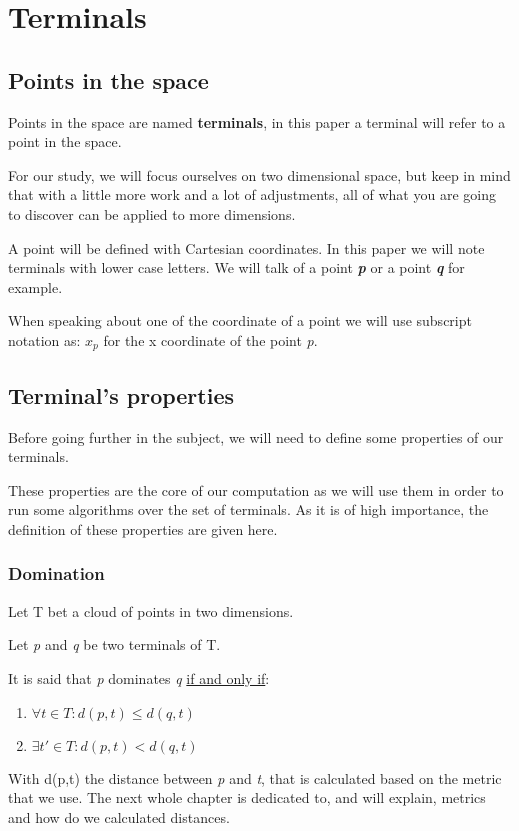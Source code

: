 \chapter{Terminals}
\section{Points in the space}
Points in the space are named \textbf{terminals}, in this paper a terminal will refer to a point in the space.\newline

For our study, we will focus ourselves on two dimensional space, but keep in mind that with a little more work and a lot of adjustments, all of what you are going to discover can be applied to more dimensions.

A point will be defined with Cartesian coordinates. In this paper we will note terminals with lower case letters. We will talk of a point \textbf{\emph{p}} or a point \textbf{\emph{q}} for example.

When speaking about one of the coordinate of a point we will use subscript notation as: $x_p$ for the x coordinate of the point \emph{p}.

\section{Terminal's properties} %
Before going further in the subject, we will need to define some properties of our terminals.

These properties are the core of our computation as we will use them in order to run some algorithms over the set of terminals. As it is of high importance, the definition of these properties are given here. 
\subsection{Domination} %
Let T bet a cloud of points in two dimensions.

Let \emph{p} and \emph{q} be two terminals of T.

\noindent It is said that \emph{p} dominates \emph{q} \underline{if and only if}:
\begin{enumerate}
	\item{$\forall t \in T : d(p,t) \leq d(q,t)$}
	\item{$\exists t' \in T : d(p,t) < d(q,t)$}
\end{enumerate} 
With d(p,t) the distance between \emph{p} and \emph{t}, that is calculated based on the metric that we use. The next whole chapter is dedicated to, and will explain, metrics and how do we calculated distances.

